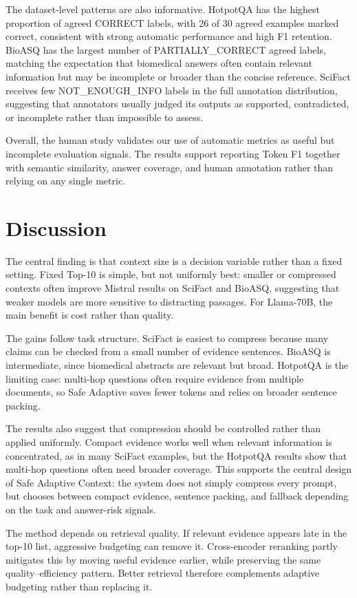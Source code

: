 \documentclass[11pt]{article}
\begin{document}
The dataset-level patterns are also informative. HotpotQA has the highest proportion of agreed CORRECT labels, with 26 of 30 agreed examples marked correct, consistent with strong automatic performance and high F1 retention. BioASQ has the largest number of PARTIALLY\_CORRECT agreed labels, matching the expectation that biomedical answers often contain relevant information but may be incomplete or broader than the concise reference. SciFact receives few NOT\_ENOUGH\_INFO labels in the full annotation distribution, suggesting that annotators usually judged its outputs as supported, contradicted, or incomplete rather than impossible to assess.

Overall, the human study validates our use of automatic metrics as useful but incomplete evaluation signals. The results support reporting Token F1 together with semantic similarity, answer coverage, and human annotation rather than relying on any single metric.

\section{Discussion}

The central finding is that context size is a decision variable rather than a fixed setting. Fixed Top-10 is simple, but not uniformly best: smaller or compressed contexts often improve Mistral results on SciFact and BioASQ, suggesting that weaker models are more sensitive to distracting passages. For Llama-70B, the main benefit is cost rather than quality.

The gains follow task structure. SciFact is easiest to compress because many claims can be checked from a small number of evidence sentences. BioASQ is intermediate, since biomedical abstracts are relevant but broad. HotpotQA is the limiting case: multi-hop questions often require evidence from multiple documents, so Safe Adaptive saves fewer tokens and relies on broader sentence packing.

The results also suggest that compression should be controlled rather than applied uniformly. Compact evidence works well when relevant information is concentrated, as in many SciFact examples, but the HotpotQA results show that multi-hop questions often need broader coverage. This supports the central design of Safe Adaptive Context: the system does not simply compress every prompt, but chooses between compact evidence, sentence packing, and fallback depending on the task and answer-risk signals.

The method depends on retrieval quality. If relevant evidence appears late in the top-10 list, aggressive budgeting can remove it. Cross-encoder reranking partly mitigates this by moving useful evidence earlier, while preserving the same quality--efficiency pattern. Better retrieval therefore complements adaptive budgeting rather than replacing it.
\end{document}
